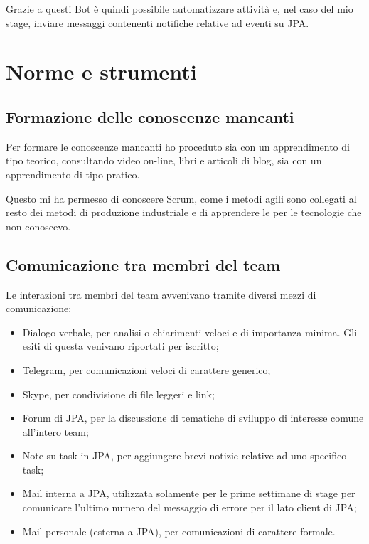 Grazie a questi Bot è quindi possibile automatizzare attività e, nel caso del
mio stage, inviare messaggi contenenti notifiche relative ad eventi su JPA.

\section{Norme e strumenti}

\subsection{Formazione delle conoscenze mancanti}

Per formare le conoscenze mancanti ho proceduto sia con un apprendimento di
tipo teorico, consultando video on-line, libri e articoli di blog, sia con un
apprendimento di tipo pratico.

Questo mi ha permesso di conoscere Scrum, come i metodi agili sono collegati
al resto dei metodi di produzione industriale e di apprendere le
 per le tecnologie che non conoscevo.

\subsection{Comunicazione tra membri del team}

Le interazioni tra membri del team avvenivano tramite diversi mezzi di
comunicazione:

\begin{itemize}
\item Dialogo verbale, per analisi o chiarimenti veloci e di importanza minima.
  Gli esiti di questa venivano riportati per iscritto;
\item Telegram, per comunicazioni veloci di carattere generico;
\item Skype, per condivisione di file leggeri e link;
\item Forum di JPA, per la discussione di tematiche di sviluppo di interesse
  comune all'intero team;
\item Note su task in JPA, per aggiungere brevi notizie relative ad uno
  specifico task;
\item Mail interna a JPA, utilizzata solamente per le prime settimane di stage
  per comunicare l'ultimo numero del messaggio di errore per il lato client di
  JPA;
\item Mail personale (esterna a JPA), per comunicazioni di carattere formale.
\end{itemize}

